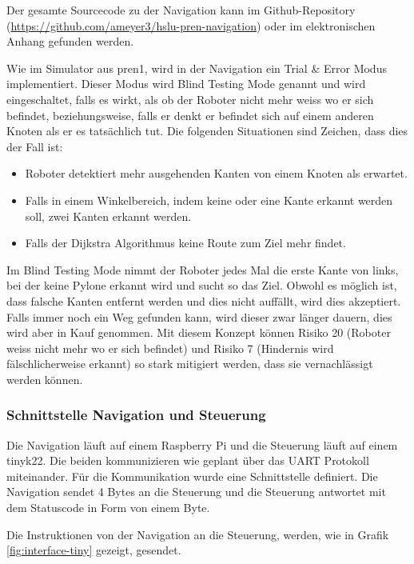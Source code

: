 Der gesamte Sourcecode zu der Navigation kann im Github-Repository (\url{https://github.com/ameyer3/hslu-pren-navigation}) oder im elektronischen Anhang gefunden werden.

Wie im Simulator aus \acrshort{pren1}, wird in der Navigation ein Trial \& Error Modus implementiert. Dieser Modus wird Blind Testing Mode genannt und wird eingeschaltet, falls es wirkt, als ob der Roboter nicht mehr weiss wo er sich befindet, beziehungsweise, falls er denkt er befindet sich auf einem anderen Knoten als er es tatsächlich tut. Die folgenden Situationen sind Zeichen, dass dies der Fall ist:

\begin{itemize}
    \item Roboter detektiert mehr ausgehenden Kanten von einem Knoten als erwartet.
    \item Falls in einem Winkelbereich, indem keine oder eine Kante erkannt werden soll, zwei Kanten erkannt werden.
    \item Falls der Dijkstra Algorithmus keine Route zum Ziel mehr findet.
\end{itemize}

Im Blind Testing Mode nimmt der Roboter jedes Mal die erste Kante von links, bei der keine Pylone erkannt wird und sucht so das Ziel. Obwohl es möglich ist, dass falsche Kanten entfernt werden und dies nicht auffällt, wird dies akzeptiert. Falls immer noch ein Weg gefunden kann, wird dieser zwar länger dauern, dies wird aber in Kauf genommen. Mit diesem Konzept können Risiko 20 (Roboter weiss nicht mehr wo er sich befindet) und Risiko 7 (Hindernis wird fälschlicherweise erkannt) so stark mitigiert werden, dass sie vernachlässigt werden können.

\subsubsection{Schnittstelle Navigation und Steuerung}
\label{interface-nav-control}

Die Navigation läuft auf einem Raspberry Pi und die Steuerung läuft auf einem \gls{tinyk22}. Die beiden kommunizieren wie geplant über das UART Protokoll miteinander. Für die Kommunikation wurde eine Schnittstelle definiert. Die Navigation sendet 4 Bytes an die Steuerung und die Steuerung antwortet mit dem Statuscode in Form von einem Byte.

Die Instruktionen von der Navigation an die Steuerung, werden, wie in Grafik \ref{fig:interface-tiny} gezeigt, gesendet.

